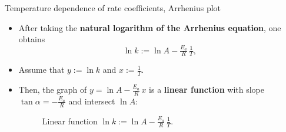 %
%
\begin{frame}{Temperature dependence of rate coefficients, Arrhenius plot}
	\begin{itemize}
		\item After taking the {\bf natural logarithm of the Arrhenius equation}, one obtains
		\[
		\ln k := \ln A - \tfrac{E_a}{R} \, \tfrac{1}{T},
		\]
		\item Assume that $y:=\ln k$ and $	x:=\tfrac{1}{T}$. 
		\item Then, the  graph of $y = \ln A - \tfrac{E_a}{R} \, x$ is a \alert{\bf linear function}
		with slope $\tan \alpha = - \tfrac{E_a}{R}$ and intersect $ \ln A$:
		  \begin{figure}
	  	  \caption{Linear function $\ln k := \ln A - \tfrac{E_a}{R} \, \tfrac{1}{T}$.}
		  \end{figure}

	\end{itemize}
\end{frame}
%
%
